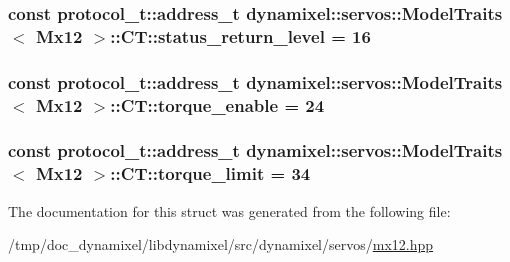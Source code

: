 \subsubsection[{status\+\_\+return\+\_\+level}]{\setlength{\rightskip}{0pt plus 5cm}const {\bf protocol\+\_\+t\+::address\+\_\+t} {\bf dynamixel\+::servos\+::\+Model\+Traits}$<$ {\bf Mx12} $>$\+::C\+T\+::status\+\_\+return\+\_\+level = 16\hspace{0.3cm}{\ttfamily [static]}}\label{structdynamixel_1_1servos_1_1_model_traits_3_01_mx12_01_4_1_1_c_t_a8111ed7bce55764840193fd6b63e10fe}
\hypertarget{structdynamixel_1_1servos_1_1_model_traits_3_01_mx12_01_4_1_1_c_t_af48b8e9e1a7663f32b8b4f44d8612796}{}
\subsubsection[{torque\+\_\+enable}]{\setlength{\rightskip}{0pt plus 5cm}const {\bf protocol\+\_\+t\+::address\+\_\+t} {\bf dynamixel\+::servos\+::\+Model\+Traits}$<$ {\bf Mx12} $>$\+::C\+T\+::torque\+\_\+enable = 24\hspace{0.3cm}{\ttfamily [static]}}\label{structdynamixel_1_1servos_1_1_model_traits_3_01_mx12_01_4_1_1_c_t_af48b8e9e1a7663f32b8b4f44d8612796}
\hypertarget{structdynamixel_1_1servos_1_1_model_traits_3_01_mx12_01_4_1_1_c_t_a59de18c11d95eb1a547adbafd535d0f7}{}
\subsubsection[{torque\+\_\+limit}]{\setlength{\rightskip}{0pt plus 5cm}const {\bf protocol\+\_\+t\+::address\+\_\+t} {\bf dynamixel\+::servos\+::\+Model\+Traits}$<$ {\bf Mx12} $>$\+::C\+T\+::torque\+\_\+limit = 34\hspace{0.3cm}{\ttfamily [static]}}\label{structdynamixel_1_1servos_1_1_model_traits_3_01_mx12_01_4_1_1_c_t_a59de18c11d95eb1a547adbafd535d0f7}


The documentation for this struct was generated from the following file\+:\begin{DoxyCompactItemize}
\item 
/tmp/doc\+\_\+dynamixel/libdynamixel/src/dynamixel/servos/\hyperlink{mx12_8hpp}{mx12.\+hpp}\end{DoxyCompactItemize}
